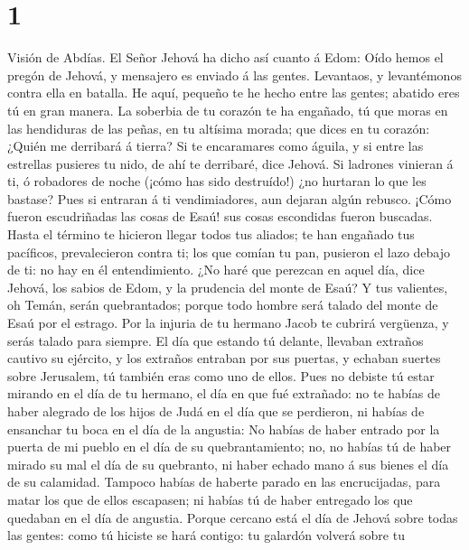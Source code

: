 \hypertarget{section}{%
\section{1}\label{section}}

 Visión de Abdías. El Señor Jehová ha dicho así cuanto á
Edom: Oído hemos el pregón de Jehová, y mensajero es enviado á las
gentes. Levantaos, y levantémonos contra ella en batalla. 
He aquí, pequeño te he hecho entre las gentes; abatido eres tú en gran
manera.  La soberbia de tu corazón te ha engañado, tú que
moras en las hendiduras de las peñas, en tu altísima morada; que dices
en tu corazón: ¿Quién me derribará á tierra?  Si te
encaramares como águila, y si entre las estrellas pusieres tu nido, de
ahí te derribaré, dice Jehová.  Si ladrones vinieran á ti, ó
robadores de noche (¡cómo has sido destruído!) ¿no hurtaran lo que les
bastase? Pues si entraran á ti vendimiadores, aun dejaran algún rebusco.
 ¡Cómo fueron escudriñadas las cosas de Esaú! sus cosas
escondidas fueron buscadas.  Hasta el término te hicieron
llegar todos tus aliados; te han engañado tus pacíficos, prevalecieron
contra ti; los que comían tu pan, pusieron el lazo debajo de ti: no hay
en él entendimiento.  ¿No haré que perezcan en aquel día,
dice Jehová, los sabios de Edom, y la prudencia del monte de Esaú?
 Y tus valientes, oh Temán, serán quebrantados; porque todo
hombre será talado del monte de Esaú por el estrago.  Por
la injuria de tu hermano Jacob te cubrirá vergüenza, y serás talado para
siempre.  El día que estando tú delante, llevaban extraños
cautivo su ejército, y los extraños entraban por sus puertas, y echaban
suertes sobre Jerusalem, tú también eras como uno de ellos.
 Pues no debiste tú estar mirando en el día de tu hermano,
el día en que fué extrañado: no te habías de haber alegrado de los hijos
de Judá en el día que se perdieron, ni habías de ensanchar tu boca en el
día de la angustia:  No habías de haber entrado por la
puerta de mi pueblo en el día de su quebrantamiento; no, no habías tú de
haber mirado su mal el día de su quebranto, ni haber echado mano á sus
bienes el día de su calamidad.  Tampoco habías de haberte
parado en las encrucijadas, para matar los que de ellos escapasen; ni
habías tú de haber entregado los que quedaban en el día de angustia.
 Porque cercano está el día de Jehová sobre todas las
gentes: como tú hiciste se hará contigo: tu galardón volverá sobre tu
